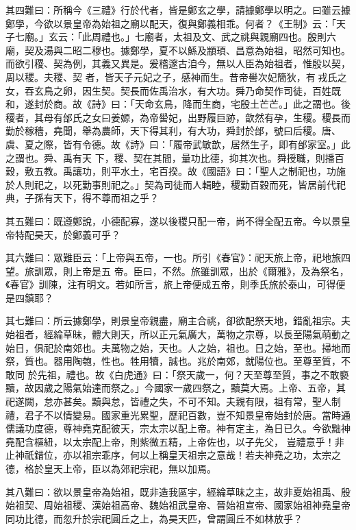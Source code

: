 \begin{pinyinscope}
 其四難曰：所稱今《三禮》行於代者，皆是鄭玄之學，請據鄭學以明之。曰雖云據鄭學，今欲以景皇帝為始祖之廟以配天，復與鄭義相乖。何者？《王制》云：「天子七廟。」玄云：「此周禮也。」七廟者，太祖及文、武之祧與親廟四也。殷則六廟，契及湯與二昭二穆也。據鄭學，夏不以鯀及顓頊、昌意為始祖，昭然可知也。而欲引稷、契為例，其義又異是。爰稽邃古洎今，無以人臣為始祖者，惟殷以契，周以稷。夫稷、契
 者，皆天子元妃之子，感神而生。昔帝嚳次妃簡狄，有戎氏之女，吞玄鳥之卵，因生契。契長而佐禹治水，有大功。舜乃命契作司徒，百姓既和，遂封於商。故《詩》曰：「天命玄鳥，降而生商，宅殷土芒芒。」此之謂也。後稷者，其母有邰氏之女曰姜嫄，為帝嚳妃，出野履巨跡，歆然有孕，生稷。稷長而勤於稼穡，堯聞，舉為農師，天下得其利，有大功，舜封於邰，號曰后稷。唐、虞、夏之際，皆有令德。故《詩》曰：「履帝武敏歆，居然生子，即有邰家室。」此之謂也。舜、禹有天
 下，稷、契在其間，量功比德，抑其次也。舜授職，則播百穀，敷五教。禹讓功，則平水土，宅百揆。故《國語》曰：「聖人之制祀也，功施於人則祀之，以死勤事則祀之。」契為司徒而人輯睦，稷勤百穀而死，皆居前代祀典，子孫有天下，得不尊而祖之乎？



 其五難曰：既遵鄭說，小德配寡，遂以後稷只配一帝，尚不得全配五帝。今以景皇帝特配昊天，於鄭義可乎？



 其六難曰：眾難臣云：「上帝與五帝，一也。所引《春官》：祀天旅上帝，祀地旅四望。旅訓眾，則上帝是五
 帝。臣曰，不然。旅雖訓眾，出於《爾雅》，及為祭名，《春官》訓陳，注有明文。若如所言，旅上帝便成五帝，則季氏旅於泰山，可得便是四鎮耶？



 其七難曰：所云據鄭學，則景皇帝親盡，廟主合祧，卻欲配祭天地，錯亂祖宗。夫始祖者，經綸草昧，體大則天，所以正元氣廣大，萬物之宗尊，以長至陽氣萌動之始日，俱祀於南郊也。夫萬物之始，天也。人之始，祖也。日之始，至也。掃地而祭，質也。器用陶匏，性也。牲用犢，誠也。兆於南郊，就陽位也。至尊至質，不敢同
 於先祖，禮也。故《白虎通》曰：「祭天歲一，何？天至尊至質，事之不敢褻黷，故因歲之陽氣始達而祭之。」今國家一歲四祭之，黷莫大焉。上帝、五帝，其祀遂闕，怠亦甚矣。黷與怠，皆禮之失，不可不知。夫親有限，祖有常，聖人制禮，君子不以情變易。國家重光累聖，歷祀百數，豈不知景皇帝始封於唐。當時通儒議功度德，尊神堯克配彼天，宗太宗以配上帝。神有定主，為日已久。今欲黜神堯配含樞紐，以太宗配上帝，則紫微五精，上帝佐也，以子先父，
 豈禮意乎！非止神祇錯位，亦以祖宗乖序，何以上稱皇天祖宗之意哉！若夫神堯之功，太宗之德，格於皇天上帝，臣以為郊祀宗祀，無以加焉。



 其八難曰：欲以景皇帝為始祖，既非造我區宇，經綸草昧之主，故非夏始祖禹、殷始祖契、周始祖稷、漢始祖高帝、魏始祖武皇帝、晉始祖宣帝、國家始祖神堯皇帝同功比德，而忽升於宗祀圓丘之上，為昊天匹，曾謂圓丘不如林放乎？




\end{pinyinscope}
